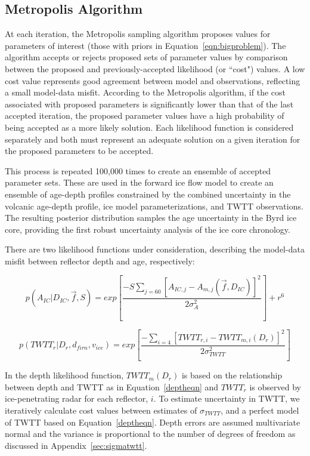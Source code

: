 \subsection{Metropolis Algorithm}\label{metrop}
At each iteration, the Metropolis sampling algorithm \citep{metropolis1953} proposes values for parameters of interest (those with priors in Equation~\ref{eqn:bigproblem}). The algorithm accepts or rejects proposed sets of parameter values by comparison between the proposed and previously-accepted likelihood (or ``cost") values. A low cost value represents good agreement between model and observations, reflecting a small model-data misfit. According to the Metropolis algorithm, if the cost associated with proposed parameters is significantly lower than that of the last accepted iteration, the proposed parameter values have a high probability of being accepted as a more likely solution. Each likelihood function is considered separately and both must represent an adequate solution on a given iteration for the proposed parameters to be accepted.

This process is repeated 100,000 times to create an ensemble of accepted parameter sets. These are used in the forward ice flow model to create an ensemble of age-depth profiles constrained by the combined uncertainty in the volcanic age-depth profile, ice model parameterizations, and TWTT observations. The resulting posterior distribution samples the age uncertainty in the Byrd ice core, providing the first robust uncertainty analysis of the ice core chronology. 

There are two likelihood functions under consideration, describing the model-data misfit between reflector depth and age, respectively:


\begin{equation}\label{eqn:loglikeage}
p(A_{IC} | D_{IC},\vec{f},S)= exp[\frac{-S\sum_{j = 60}[A_{IC,j} - A_{m,j}(\vec{f},D_{IC})]^2}{2\sigma_A^2}] + r^6
\end{equation}

\begin{equation}\label{eqn:loglikedepth}
p(TWTT_r | D_r,d_{firn},v_{ice} )= exp[\frac{-\sum_{i=4}[TWTT_{r,i} - TWTT_{m,i}(D_r)]^2}{2\sigma_{TWTT}^2}]
\end{equation}


In the depth likelihood function, $TWTT_m(D_r)$ is based on the relationship between depth and TWTT as in Equation~\ref{deptheqn} and $TWTT_r$ is observed by ice-penetrating radar for each reflector, $i$. To estimate uncertainty in TWTT, we iteratively calculate cost values between estimates of $\sigma_{TWTT}$, and a perfect model of TWTT based on Equation~\ref{deptheqn}. Depth errors are assumed multivariate normal and the variance is proportional to the number of degrees of freedom as discussed in Appendix~\ref{sec:sigmatwtt}. 



